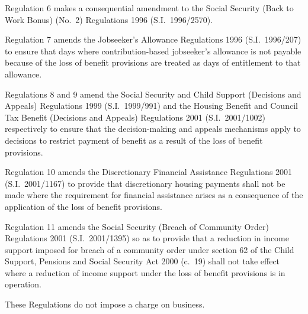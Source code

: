 \documentclass[12pt,a4paper]{article}
\begin{document}
Regulation 6 makes a consequential amendment to the Social Security (Back to Work Bonus) (No.\ 2) Regulations 1996 (S.I.\ 1996/2570).

Regulation 7 amends the Jobseeker’s Allowance Regulations 1996 (S.I.\ 1996/207) to ensure that days where contribution-based jobseeker’s allowance is not payable because of the loss of benefit provisions are treated as days of entitlement to that allowance.

Regulations 8 and 9 amend the Social Security and Child Support (Decisions and Appeals) Regulations 1999 (S.I.\ 1999/991) and the Housing Benefit and Council Tax Benefit (Decisions and Appeals) Regulations 2001 (S.I.\ 2001/1002) respectively to ensure that the decision-making and appeals mechanisms apply to decisions to restrict payment of benefit as a result of the loss of benefit provisions.

Regulation 10 amends the Discretionary Financial Assistance Regulations 2001 (S.I.\ 2001/1167) to provide that discretionary housing payments shall not be made where the requirement for financial assistance arises as a consequence of the application of the loss of benefit provisions.

Regulation 11 amends the Social Security (Breach of Community Order) Regulations 2001 (S.I.\ 2001/1395) so as to provide that a reduction in income support imposed for breach of a community order under section 62 of the Child Support, Pensions and Social Security Act 2000 (c.\ 19) shall not take effect where a reduction of income support under the loss of benefit provisions is in operation.

These Regulations do not impose a charge on business. 
\end{document}
